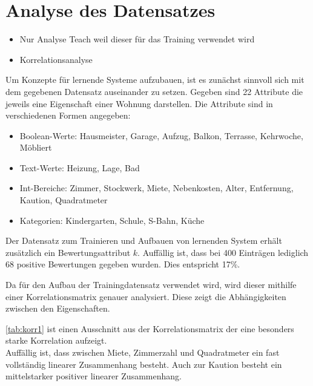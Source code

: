 \section{Analyse des Datensatzes}\label{sec:analyse}
\begin{itemize}
    \item Nur Analyse Teach weil dieser für das Training verwendet wird
    \item Korrelationsanalyse
\end{itemize}

Um Konzepte für lernende Systeme aufzubauen, ist es zunächst sinnvoll sich mit 
dem gegebenen Datensatz auseinander zu setzen. 
Gegeben sind 22 Attribute die jeweils eine Eigenschaft einer Wohnung darstellen. 
Die Attribute sind in verschiedenen Formen angegeben: 
\begin{itemize}
    \item Boolean-Werte: Hausmeister, Garage, Aufzug, Balkon, Terrasse, Kehrwoche, Möbliert
    \item Text-Werte: Heizung, Lage, Bad
    \item Int-Bereiche: Zimmer, Stockwerk, Miete, Nebenkosten, Alter, Entfernung, Kaution, Quadratmeter
    \item Kategorien: Kindergarten, Schule, S-Bahn, Küche
\end{itemize}

Der Datensatz zum Trainieren und Aufbauen von lernenden System erhält zusätzlich 
ein Bewertungsattribut $k$. 
Auffällig ist, dass bei 400 Einträgen lediglich 68 positive Bewertungen gegeben wurden. 
Dies entspricht 17\%. 

Da für den Aufbau der Trainingdatensatz verwendet wird, wird dieser mithilfe einer Korrelationsmatrix 
genauer analysiert. Diese zeigt die Abhängigkeiten zwischen den Eigenschaften. 

\autoref{tab:korr1} ist einen Ausschnitt aus der Korrelationsmatrix der eine besonders starke Korrelation aufzeigt. \\
Auffällig ist, dass zwischen Miete, Zimmerzahl und Quadratmeter ein fast vollständig linearer Zusammenhang
besteht. Auch zur Kaution besteht ein mittelstarker positiver linearer Zusammenhang.

